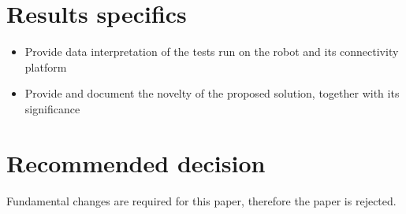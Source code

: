 \documentclass{article}
\begin{document}
\section{Results specifics}

\begin{itemize}

    \item Provide data interpretation of the tests run on the robot and its connectivity platform
    \item Provide and document the novelty of the proposed solution, together with its significance

\end{itemize}

\section{Recommended decision}

Fundamental changes are required for this paper, therefore the paper is rejected.
\end{document}
